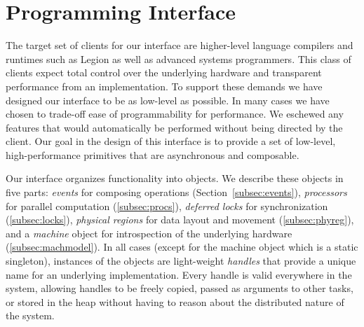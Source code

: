 
\section{Programming Interface}
\label{sec:interface}
The target set of clients for our interface are higher-level language
compilers and runtimes such as Legion\cite{Legion12} as well as 
advanced systems programmers.  This class of clients expect total control
over the underlying hardware and transparent performance from an
implementation.  To support these demands we have designed our interface
to be as low-level as possible.  In many cases we have chosen to trade-off
ease of programmability for performance.  We eschewed any features that would
automatically be performed without being directed by the client.
Our goal in the design of this interface is to provide a set of low-level,
high-performance primitives that are asynchronous and composable.

Our interface organizes functionality into objects.  We describe
these objects in five parts: {\em events} for composing operations 
(Section~\ref{subsec:events}), {\em processors} for parallel computation 
(\ref{subsec:procs}), {\em deferred locks} for synchronization
(\ref{subsec:locks}), {\em physical regions} for data layout and movement
(\ref{subsec:phyreg}), and a {\em machine} object for introspection of the underlying
hardware (\ref{subsec:machmodel}).  In all cases (except for the
machine object which is a static singleton), instances of the objects
are light-weight {\em handles} that provide a unique name for an underlying
implementation.
Every handle is valid everywhere in the system, allowing handles to be freely copied,
passed as arguments to other tasks, or stored in the heap
without having to reason about the distributed nature of the system.



